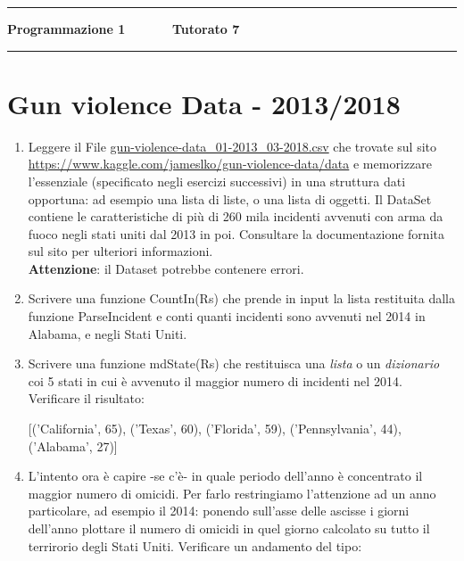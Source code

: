 \documentclass[11pt,a4]{article}
\begin{document}
\thispagestyle{empty}
\hrule
\begin{center}
   {\Large {\bf Programmazione 1 \hspace{3cm} $\quad \quad \quad$ Tutorato 7}}
\end{center}

\hrule

\section*{Gun violence Data - 2013/2018}



\begin{enumerate}

\item Leggere il File \url{gun-violence-data_01-2013_03-2018.csv} che trovate sul sito \url{https://www.kaggle.com/jameslko/gun-violence-data/data} e memorizzare l'essenziale (specificato negli esercizi successivi) in una struttura dati opportuna: ad esempio una lista di liste, o una lista di oggetti. Il DataSet contiene le
caratteristiche di più di 260 mila incidenti avvenuti con arma da fuoco negli stati uniti dal 2013 in poi. Consultare la documentazione fornita sul sito per ulteriori informazioni.\\

\textbf{Attenzione}: il Dataset potrebbe contenere errori.


\item Scrivere una funzione CountIn(Rs) che prende in input la lista restituita dalla funzione
ParseIncident e conti quanti incidenti sono avvenuti nel 2014 in Alabama, e negli Stati Uniti.

\item Scrivere una funzione mdState(Rs) che restituisca una \textit{lista} o un \textit{dizionario} coi 5 stati in cui è avvenuto il maggior numero di incidenti nel 2014. Verificare il risultato:
\begin{center}
[('California', 65),
 ('Texas', 60),
 ('Florida', 59),
 ('Pennsylvania', 44),
 ('Alabama', 27)]
\end{center}

\item L'intento ora è capire -se c'è- in quale periodo dell'anno è concentrato il maggior numero di omicidi. Per farlo restringiamo l'attenzione ad un anno particolare, ad esempio il 2014: ponendo sull'asse delle ascisse i giorni dell'anno plottare il numero di omicidi in quel giorno calcolato su tutto il terrirorio degli Stati Uniti. Verificare un andamento del tipo:

\begin{figure}[!ht]
\centering
{}
\end{figure}


\end{enumerate}
\end{document}
